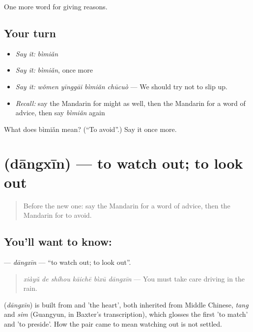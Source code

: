 \begin{grammarlens}[title={What you've built}]
One more word for giving reasons.
\end{grammarlens}

\subsection*{Your turn}
\begin{itemize}
\raggedright
  \item \emph{Say it:} \emph{bìmiǎn}
  \item \emph{Say it:} \emph{bìmiǎn}, once more
  \item \emph{Say it:} \emph{wǒmen yīnggāi bìmiǎn chūcuò} — We should try not to slip up.
  \item \emph{Recall:} say the Mandarin for might as well, then the Mandarin for a word of advice, then say \emph{bìmiǎn} again
\end{itemize}

\begin{tcolorbox}[breakable,colback=teal!4,colframe=teal!35!black,title={Before you move on}]
What does bìmiǎn mean? (\textquotedblleft{}To avoid\textquotedblright{}.) Say it once more.
\end{tcolorbox}
\section[\texorpdfstring{\zh{当心} (dāngxīn)}{当心 (dāngxīn)}]{ (dāngxīn) — to watch out; to look out}

\label{lesson:ZH-C366-dangxin}



\begin{quote}
Before the new one: say the Mandarin for a word of advice, then the Mandarin for to avoid.
\end{quote}

\subsection*{You'll want to know: }
\textbf{} — \emph{dāngxīn} — \textquotedblleft{}to watch out; to look out\textquotedblright{}.

\begin{quote}
\textbf{} \emph{xiàyǔ de shíhou kāichē bìxū dāngxīn} — You must take care driving in the rain.
\end{quote}

\begin{cousinweb}
\textbf{} (\emph{dāngxīn}) is built from  and  'the heart', both inherited from Middle Chinese, \emph{tang} and \emph{sim} (Guangyun, in Baxter's transcription), which glosses the first 'to match' and 'to preside'. How the pair came to mean watching out is not settled.
\end{cousinweb}

